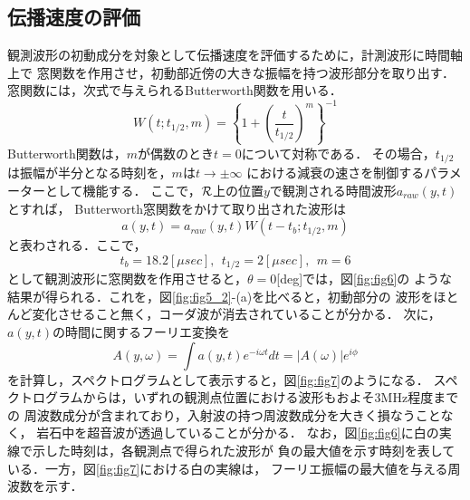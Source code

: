 \subsection{伝播速度の評価}
観測波形の初動成分を対象として伝播速度を評価するために，計測波形に時間軸上で
窓関数を作用させ，初動部近傍の大きな振幅を持つ波形部分を取り出す．
窓関数には，次式で与えられるButterworth関数を用いる．
\begin{equation}
	W(t;t_{1/2},m)=
	\left\{
		1+\left(\frac{t}{t_{1/2}}\right)^m
	\right\}^{-1}
	\label{eqn:Butterworth}
\end{equation}
Butterworth関数は，$m$が偶数のとき$t=0$について対称である．
その場合，$t_{1/2}$は振幅が半分となる時刻を，$m$は$t\rightarrow \pm \infty$
における減衰の速さを制御するパラメーターとして機能する．
ここで，$\cal R$上の位置$y$で観測される時間波形$a_{raw}(y,t)$とすれば，
Butterworth窓関数をかけて取り出された波形は
\begin{equation}
	a(y,t)=a_{raw}(y,t)W(t-t_b;t_{1/2},m)
\end{equation}
と表わされる．ここで，
\[
	t_b=18.2[\mu sec], \ \ t_{1/2}=2[\mu sec], \ \ m=6
\]
として観測波形に窓関数を作用させると，$\theta=0$[deg]では，図\ref{fig:fig6}の
ような結果が得られる．これを，図\ref{fig:fig5_2}-(a)を比べると，初動部分の
波形をほとんど変化させること無く，コーダ波が消去されていることが分かる．
次に，$a(y,t)$の時間に関するフーリエ変換を
\begin{equation}
	A(y, \omega)=\int a(y, t)e^{-i\omega t}dt=\left| A(\omega) \right|e^{i\phi}
	\label{eqn:def_FFT}
\end{equation}
を計算し，スペクトログラムとして表示すると，図\ref{fig:fig7}のようになる．
スペクトログラムからは，いずれの観測点位置における波形もおよそ3MHz程度までの
周波数成分が含まれており，入射波の持つ周波数成分を大きく損なうことなく，
岩石中を超音波が透過していることが分かる．
なお，図\ref{fig:fig6}に白の実線で示した時刻は，各観測点で得られた波形が
負の最大値を示す時刻を表している．一方，図\ref{fig:fig7}における白の実線は，
フーリエ振幅の最大値を与える周波数を示す．


